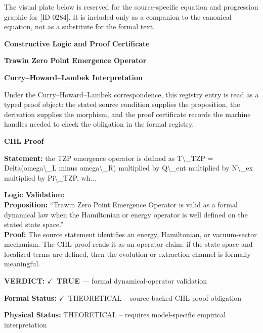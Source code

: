 \begingroup\footnotesize\sloppy
The visual plate below is reserved for the source-specific equation and progression graphic for [ID 0284]. It is included only as a companion to the canonical equation, not as a substitute for the formal text.
\par\endgroup
\ifTZPDarkEdition
{}
\fi

\clearpage
\begingroup\tzpsupportsetup
\noindent\textbf{\fontsize{10.8pt}{12.8pt}\selectfont [ID 0284] Constructive Logic and Proof Certificate}\par
\noindent\textbf{\fontsize{10pt}{12pt}\selectfont Trawin Zero Point Emergence Operator}\par
\vspace{0.45em}
\begingroup
\footnotesize
\setlength{\parskip}{0.22em}
\setlength{\parindent}{0pt}
\noindent\textbf{Curry--Howard--Lambek Interpretation}\par
Under the Curry--Howard--Lambek correspondence, this registry entry is read as a typed proof
object: the stated source condition supplies the proposition, the derivation supplies the
morphism, and the proof certificate records the machine handles needed to check the obligation
in the formal registry.

\vspace{0.45em}
\noindent\textbf{CHL Proof}\par
\textbf{Statement:} the TZP emergence operator is defined as T\textbackslash{}\_TZP = Delta(omega\textbackslash{}\_L minus omega\textbackslash{}\_R)
multiplied by Q\textbackslash{}\_ent multiplied by N\textbackslash{}\_ex multiplied by Pi\textbackslash{}\_TZP, wh...

\textbf{Logic Validation:}\\
\textbf{Proposition:} ``Trawin Zero Point Emergence Operator is valid as a formal dynamical law when the
Hamiltonian or energy operator is well defined on the stated state space.''\\
\textbf{Proof:} The source statement identifies an energy, Hamiltonian, or vacuum-sector mechanism. The
CHL proof reads it as an operator claim: if the state space and localized terms are
defined, then the evolution or extraction channel is formally meaningful.

\textbf{VERDICT:} \ensuremath{\checkmark}\ \textbf{TRUE} --- formal dynamical-operator validation

\textbf{Formal Status:} \ensuremath{\checkmark}\ THEORETICAL -- source-backed CHL proof obligation

\textbf{Physical Status:} THEORETICAL -- requires model-specific empirical interpretation
\par\vspace{0.45em}
\par
\ifTZPDarkEdition
{}
\fi
\endgroup
\endgroup
